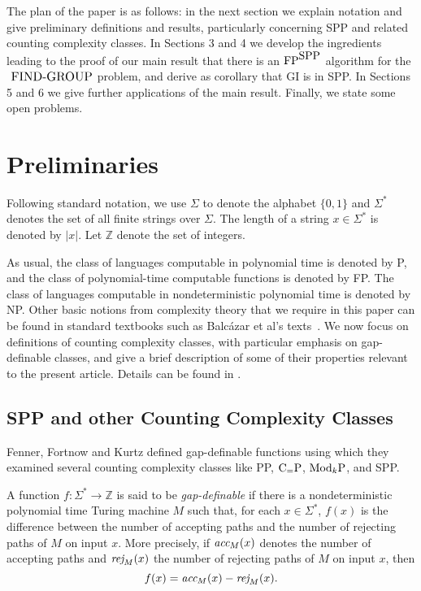 \documentclass{elsart}
\newcommand{\FP}{\mbox{\rm FP}}
\newcommand{\ModkP}{\mbox{\rm Mod$_k$P}}
\newcommand{\SPP}{\mbox{\rm SPP}}
\newcommand{\CeqP}{\mbox{\rm C$_=$P}}
\newcommand{\acc}{\mbox{\it acc}}
\newcommand{\rej}{\mbox{\it rej}}
\newcommand{\FINDGROUP}{\mbox{\small\rm FIND{-}GROUP}}
\begin{document}
The plan of the paper is as follows: in the next section we explain
notation and give preliminary definitions and results, particularly
concerning SPP and related counting complexity classes. In Sections 3
and 4 we develop the ingredients leading to the proof of our main
result that there is an $\FP^{\SPP}$ algorithm for the $\FINDGROUP$
problem, and derive as corollary that GI is in SPP. In Sections 5 and
6 we give further applications of the main result.  Finally, we state
some open problems.

\section{Preliminaries}

Following standard  notation, we use  $\Sigma$ to denote  the alphabet
$\{0,1\}$ and  $\Sigma^*$ denotes the  set of all finite  strings over
$\Sigma$. The length  of a string $x\in\Sigma^*$ is  denoted by $|x|$.
Let $\mathbb{Z}$ denote the set of integers.

As usual, the class of languages computable in polynomial time is
denoted by P, and the class of polynomial-time computable functions is
denoted by FP. The class of languages computable in nondeterministic
polynomial time is denoted by NP. Other basic notions from complexity
theory that we require in this paper can be found in standard
textbooks such as Balc\'azar et al's
texts~\cite{structcomp1,structcomp2}.  We now focus on definitions of
counting complexity classes, with particular emphasis on gap-definable
classes, and give a brief description of some of their properties
relevant to the present article. Details can be found in
\cite{fenner91gapdefinable,fenner93oracle,fortnow98complexity,Fe03}.

\subsection{\bf SPP and other Counting Complexity Classes}\label{defs}

Fenner, Fortnow and Kurtz defined gap-definable functions
\cite{fenner91gapdefinable} using which they examined several counting
complexity classes like PP, $\CeqP$, $\ModkP$, and SPP.

\begin{defn}\label{gapdefinable}
  A function $f:\Sigma^*\rightarrow\mathbb{Z}$ is said to be {\em
    gap-definable} if there is a nondeterministic polynomial time
  Turing machine $M$ such that, for each $x\in\Sigma^*$, $f(x)$ is the
  difference between the number of accepting paths and the number of
  rejecting paths of $M$ on input $x$. More precisely, if $\acc_M(x)$
  denotes the number of accepting paths and $\rej_M(x)$ the number of
  rejecting paths of $M$ on input $x$, then 
\[
f(x)=\acc_M(x)-\rej_M(x).
\]
\end{defn}
\end{document}
